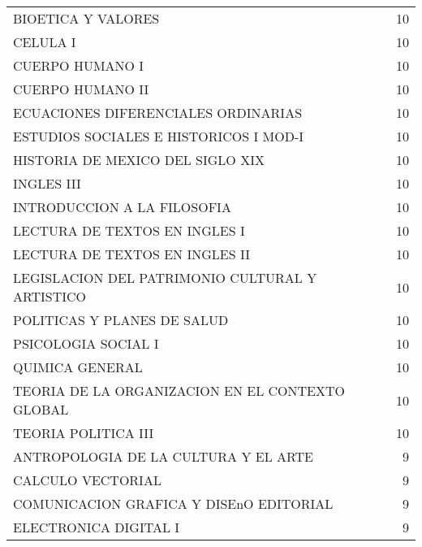 \documentclass[12pt]{article}
\begin{document}
\begin{table}[ht]
{\begin{tabular}{lr}
 BIOETICA Y VALORES & 10 \\ 
 CELULA I & 10 \\ 
 CUERPO HUMANO I & 10 \\ 
 CUERPO HUMANO II & 10 \\ 
 ECUACIONES DIFERENCIALES ORDINARIAS & 10 \\ 
 ESTUDIOS SOCIALES E HISTORICOS I MOD-I & 10 \\ 
 HISTORIA DE MEXICO DEL SIGLO XIX & 10 \\ 
 INGLES III & 10 \\ 
 INTRODUCCION A LA FILOSOFIA & 10 \\ 
 LECTURA DE TEXTOS EN INGLES I & 10 \\ 
 LECTURA DE TEXTOS EN INGLES II & 10 \\ 
 LEGISLACION DEL PATRIMONIO CULTURAL Y ARTISTICO & 10 \\ 
 POLITICAS Y PLANES DE SALUD & 10 \\ 
 PSICOLOGIA SOCIAL I & 10 \\ 
 QUIMICA GENERAL & 10 \\ 
 TEORIA DE LA ORGANIZACION EN EL CONTEXTO GLOBAL & 10 \\ 
 TEORIA POLITICA III & 10 \\ 
 ANTROPOLOGIA DE LA CULTURA Y EL ARTE & 9 \\ 
 CALCULO VECTORIAL & 9 \\ 
 COMUNICACION GRAFICA Y DISEnO EDITORIAL & 9 \\ 
 ELECTRONICA DIGITAL I & 9 \\ 
  \hline
\end{tabular}}
\end{table}
\end{document}
